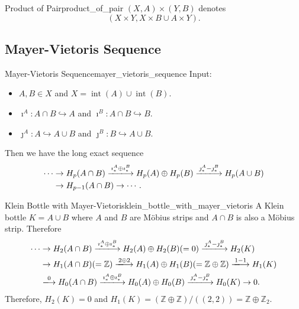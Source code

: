 \documentclass{article}
\begin{document}
\begin{definition}{Product of Pair}{product_of_pair}
    $(X,A) \times (Y,B)$ denotes
    \[ (X\times Y, X\times B \cup A\times Y). \]
\end{definition}
 
\subsection{Mayer-Vietoris Sequence}

\begin{theorem}{Mayer-Vietoris Sequence}{mayer_vietoris_sequence}
    Input:
    \begin{itemize}
        \item $A,B\in X$ and $X = \operatorname{int}(A) \cup \operatorname{int}(B)$.
        \item $\imath^A: A\cap B \hookrightarrow A$ and $\imath^B: A\cap B \hookrightarrow B$.
        \item $\jmath^A: A \hookrightarrow A\cup B$ and $\jmath^B: B \hookrightarrow A\cup B$.
    \end{itemize}
    Then we have the long exact sequence
    \begin{align*}
        \cdots &\rightarrow H_p(A\cap B) \xlongrightarrow{\imath^A_* \oplus \imath^B_*} H_p(A) \oplus H_p(B) \xlongrightarrow{\jmath^A_* - \jmath^B_*} H_p(A\cup B) \\
        & \rightarrow H_{p-1}(A\cap B) \rightarrow \cdots.
    \end{align*}
\end{theorem}

\begin{example}{Klein Bottle with Mayer-Vietoris}{klein_bottle_with_mayer_vietoris}
    A Klein bottle $K = A \cup B$ where $A$ and $B$ are M\"obius strips and $A\cap B$ is also a M\"obius strip.
    Therefore
    \begin{align*}
        \cdots &\rightarrow H_2(A\cap B) \xlongrightarrow{\imath^A_* \oplus \imath^B_*} H_2(A) \oplus H_2(B) (=0) \xlongrightarrow{\jmath^A_* - \jmath^B_*} H_2(K) \\
        & \rightarrow H_1(A\cap B) (=\mathbb{Z}) \xlongrightarrow{2\oplus 2} H_1(A) \oplus H_1(B) (=\mathbb{Z}\oplus \mathbb{Z}) \xlongrightarrow{1 - 1} H_1(K) \\
        & \xlongrightarrow{0} H_0(A\cap B) \xlongrightarrow{\imath^A_* \oplus \imath^B_*} H_0(A) \oplus H_0(B) \xlongrightarrow{\jmath^A_* - \jmath^B_*} H_0(K) \rightarrow 0.
    \end{align*}
    Therefore, $H_2(K) = 0$ and $H_1(K)= (\mathbb{Z}\oplus \mathbb{Z})/((2,2)) = \mathbb{Z}\oplus \mathbb{Z}_2$.
\end{example}
\end{document}
